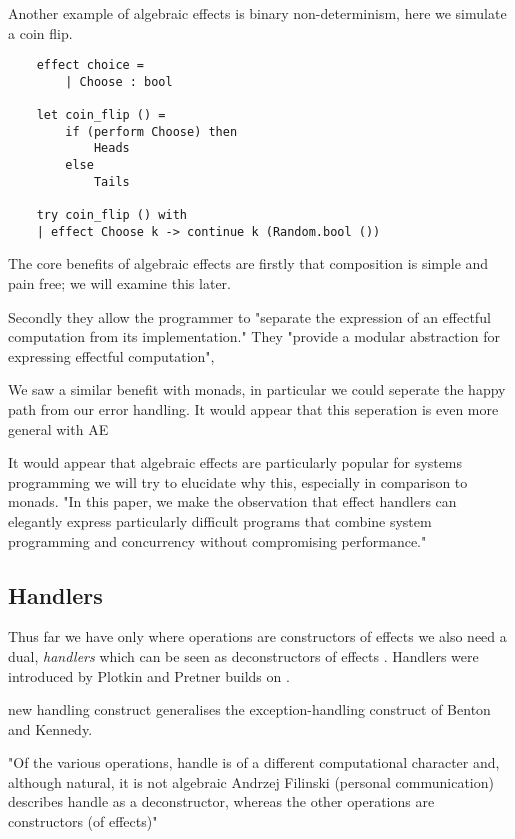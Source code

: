 Another example of algebraic effects is binary non-determinism,
here we simulate a coin flip.
\begin{example}
    \begin{verbatim}
    effect choice =
        | Choose : bool

    let coin_flip () =
        if (perform Choose) then
            Heads
        else
            Tails

    try coin_flip () with
    | effect Choose k -> continue k (Random.bool ())
    \end{verbatim}
\end{example}

The core benefits of algebraic effects are
firstly that composition is simple and pain free;
we will examine this later.

Secondly they allow the programmer to
"separate the expression of an effectful computation from its implementation."
They "provide a modular abstraction for expressing effectful computation"\cite{dolan2015effective},
\cite{dolan2015effective}

We saw a similar benefit with monads,
in particular we could seperate the happy path from our error handling.
It would appear that this seperation is even more general with AE

It would appear that algebraic effects are particularly popular
for systems programming
\cite{dolan2015effective}
\cite{dolan2017concurrent}
\cite{dolaneffectively}
\cite{Dolan:2017}
we will try to elucidate why this,
especially in comparison to monads.
"In this paper, we make the observation that effect handlers
can elegantly express particularly difficult programs
that combine system programming and concurrency without compromising performance."
\cite{Dolan:2017}

\subsection{Handlers}
Thus far we have only
where operations are constructors of effects
we also need a dual,
\textit{handlers} which can be seen as deconstructors of effects
\cite{}.
Handlers were introduced by Plotkin and Pretner\cite{Plotkin:2009dr}
builds on
\cite{benton2001exceptional}.

new handling construct generalises the exception-handling construct of Benton and Kennedy. \cite{benton2001exceptional}

"Of the various operations, handle is of a different computational character and,
although natural, it is not algebraic
Andrzej Filinski (personal communication) describes handle as a deconstructor,
whereas the other operations are constructors (of effects)"
\cite{Plotkin:2002dw}

